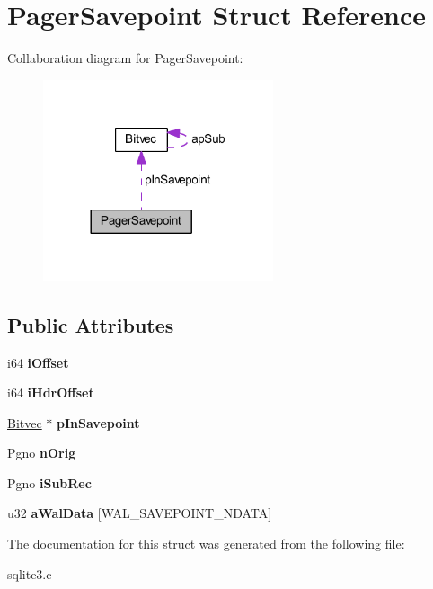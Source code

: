 \hypertarget{struct_pager_savepoint}{\section{Pager\-Savepoint Struct Reference}
\label{struct_pager_savepoint}
}


Collaboration diagram for Pager\-Savepoint\-:\nopagebreak
\begin{figure}[H]
\begin{center}
\leavevmode
\includegraphics[width=192pt]{struct_pager_savepoint__coll__graph}
\end{center}
\end{figure}
\subsection*{Public Attributes}
\begin{DoxyCompactItemize}
\item 
\hypertarget{struct_pager_savepoint_ab3ee7b75a10f47a82c8e3312bee6ad60}{i64 {\bfseries i\-Offset}}\label{struct_pager_savepoint_ab3ee7b75a10f47a82c8e3312bee6ad60}

\item 
\hypertarget{struct_pager_savepoint_ae1afd1cf4fba6f7efd232656366121d1}{i64 {\bfseries i\-Hdr\-Offset}}\label{struct_pager_savepoint_ae1afd1cf4fba6f7efd232656366121d1}

\item 
\hypertarget{struct_pager_savepoint_abf7d6dc9d457c866727f84c4b9e0348f}{\hyperlink{struct_bitvec}{Bitvec} $\ast$ {\bfseries p\-In\-Savepoint}}\label{struct_pager_savepoint_abf7d6dc9d457c866727f84c4b9e0348f}

\item 
\hypertarget{struct_pager_savepoint_a944cca2844a51bdba253476f516b9865}{Pgno {\bfseries n\-Orig}}\label{struct_pager_savepoint_a944cca2844a51bdba253476f516b9865}

\item 
\hypertarget{struct_pager_savepoint_ac1accce313b9da31631892e2cbe85a2f}{Pgno {\bfseries i\-Sub\-Rec}}\label{struct_pager_savepoint_ac1accce313b9da31631892e2cbe85a2f}

\item 
\hypertarget{struct_pager_savepoint_ac96cff844a24378c426a9901517f1d6c}{u32 {\bfseries a\-Wal\-Data} \mbox{[}W\-A\-L\-\_\-\-S\-A\-V\-E\-P\-O\-I\-N\-T\-\_\-\-N\-D\-A\-T\-A\mbox{]}}\label{struct_pager_savepoint_ac96cff844a24378c426a9901517f1d6c}

\end{DoxyCompactItemize}


The documentation for this struct was generated from the following file\-:\begin{DoxyCompactItemize}
\item 
sqlite3.\-c\end{DoxyCompactItemize}

